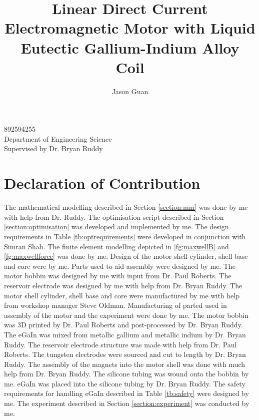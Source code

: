 \documentclass[a4paper,12pt]{article}
\title{Linear Direct Current Electromagnetic Motor with Liquid Eutectic Gallium-Indium Alloy Coil}
\author{Jason Guan}
\begin{document}
\maketitle
\begin{center}
    892594255\\
    Department of Engineering Science\\
    Supervised by Dr. Bryan Ruddy
\end{center}
\thispagestyle{empty}

\newpage

\section*{Declaration of Contribution}
    The mathematical modelling described in Section \ref{section:mm} was done by me with help from Dr. Ruddy. The optimisation script described in Section \ref{section:optimisation} was developed and implemented by me. The design requirements in Table \ref{tb:optrequirements} were developed in conjunction with Simran Shah. The finite element modelling depicted in \ref{fg:maxwellB} and \ref{fg:maxwellforce} was done by me. Design of the motor shell cylinder, shell base and core were by me. Parts used to aid assembly were designed by me. The motor bobbin was designed by me with input from Dr. Paul Roberts. The reservoir electrode was designed by me with help from Dr. Bryan Ruddy. The motor shell cylinder, shell base and core were manufactured by me with help from workshop manager Steve Oldman. Manufacturing of parted used in assembly of the motor and the experiment were done by me. The motor bobbin was 3D printed by Dr. Paul Roberts and post-processed by Dr. Bryan Ruddy. The eGaIn was mixed from metallic gallium and metallic indium by Dr. Bryan Ruddy. The reservoir electrode structure was made with help from Dr. Paul Roberts. The tungsten electrodes were sourced and cut to length by Dr. Bryan Ruddy. The assembly of the magnets into the motor shell was done with much help from Dr. Bryan Ruddy. The silicone tubing was wound onto the bobbin by me. eGaIn was placed into the silicone tubing by Dr. Bryan Ruddy. The safety requirements for handling eGaIn described in Table \ref{tb:safety} were designed by me. The experiment described in Section \ref{section:experiment} was conducted by me.
\newpage
\end{document}
